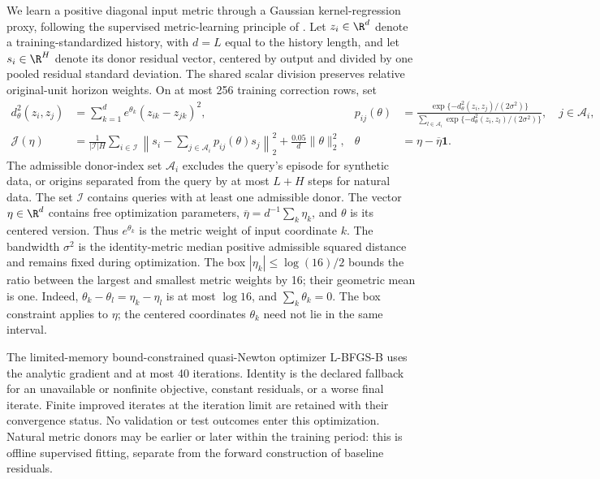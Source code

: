 We learn a positive diagonal input metric through a Gaussian
kernel-regression proxy, following the supervised metric-learning
principle of \citet{Weinberger2007Metric}. Let $z_i\in\R^d$ denote a training-standardized history, with
$d=L$ equal to the history length, and let $s_i\in\R^H$ denote its donor residual vector,
centered by output and divided by one pooled residual standard deviation.
The shared scalar division preserves relative original-unit horizon
weights. On at most 256 training correction rows, set
\begin{align}
 d_\theta^2(z_i,z_j)&=\sum_{k=1}^{d}e^{\theta_k}(z_{ik}-z_{jk})^2,
 &p_{ij}(\theta)&=
 \frac{\exp\{-d_\theta^2(z_i,z_j)/(2\sigma^2)\}}
      {\sum_{l\in\mathcal A_i}\exp\{-d_\theta^2(z_i,z_l)/(2\sigma^2)\}},
 \quad j\in\mathcal A_i,\label{eq:target-metric-weights}\\
 \mathcal J(\eta)&=
 \frac{1}{|\mathcal I|H}\sum_{i\in\mathcal I}
 \left\|s_i-\sum_{j\in\mathcal A_i}p_{ij}(\theta)s_j\right\|_2^2
 +\frac{0.05}{d}\|\theta\|_2^2,
 &\theta&=\eta-\overline\eta\mathbf1.
 \label{eq:target-metric-objective}
\end{align}
The admissible donor-index set $\mathcal A_i$ excludes the query's episode for synthetic
data, or origins separated from the query by at most $L+H$ steps for natural
data. The set $\mathcal I$ contains queries with at least one admissible
donor. The vector $\eta\in\R^d$ contains free optimization parameters,
$\overline\eta=d^{-1}\sum_k\eta_k$, and $\theta$ is its centered
version. Thus $e^{\theta_k}$ is the metric weight of input coordinate $k$. The bandwidth $\sigma^2$ is the identity-metric
median positive admissible squared distance and remains fixed during
optimization. The box $|\eta_k|\leq\log(16)/2$ bounds the ratio between
the largest and smallest metric weights by 16; their geometric mean is
one. Indeed, $\theta_k-\theta_l=\eta_k-\eta_l$ is at most
$\log16$, and $\sum_k\theta_k=0$. The box constraint applies
to $\eta$; the centered coordinates $\theta_k$ need not lie in
the same interval.

The limited-memory bound-constrained quasi-Newton optimizer L-BFGS-B
uses the analytic gradient and at most 40 iterations.
Identity is the declared fallback for an unavailable or nonfinite
objective, constant residuals, or a worse final iterate. Finite improved
iterates at the iteration limit are retained with their convergence
status. No validation or test outcomes enter this optimization. Natural
metric donors may be earlier or later within the training period: this
is offline supervised fitting, separate from the forward construction
of baseline residuals.

